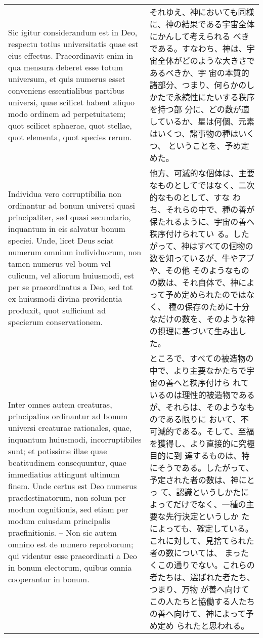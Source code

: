 \documentclass[10pt]{jsarticle} %
\begin{document}
\begin{longtable}{p{21em}p{21em}}
\\


Sic igitur
considerandum est in Deo, respectu totius universitatis quae est eius
effectus. Praeordinavit enim in qua mensura deberet esse totum
universum, et quis numerus esset conveniens essentialibus partibus
universi, quae scilicet habent aliquo modo ordinem ad perpetuitatem;
quot scilicet sphaerae, quot stellae, quot elementa, quot species
rerum. 


&

それゆえ、神においても同様に、神の結果である宇宙全体にかんして考えられる
 べきである。すなわち、神は、宇宙全体がどのような大きさであるべきか、宇
 宙の本質的諸部分、つまり、何らかのしかたで永続性にたいする秩序を持つ部
 分に、どの数が適しているか、星は何個、元素はいくつ、諸事物の種はいくつ、
 ということを、予め定めた。


\\


Individua vero corruptibilia non ordinantur ad bonum universi
quasi principaliter, sed quasi secundario, inquantum in eis salvatur
bonum speciei. Unde, licet Deus sciat numerum omnium individuorum, non
tamen numerus vel boum vel culicum, vel aliorum huiusmodi, est per se
praeordinatus a Deo, sed tot ex huiusmodi divina providentia produxit,
quot sufficiunt ad specierum conservationem. 

&

他方、可滅的な個体は、主要なものとしてではなく、二次的なものとして、すな
 わち、それらの中で、種の善が保たれるように、宇宙の善へ秩序付けられてい
 る。したがって、神はすべての個物の数を知っているが、牛やアブや、その他
 そのようなものの数は、それ自体で、神によって予め定められたのではなく、
 種の保存のために十分なだけの数を、そのような神の摂理に基づいて生み出し
 た。


\\

Inter omnes autem
creaturas, principalius ordinantur ad bonum universi creaturae
rationales, quae, inquantum huiusmodi, incorruptibiles sunt; et
potissime illae quae beatitudinem consequuntur, quae immediatius
attingunt ultimum finem. Unde certus est Deo numerus praedestinatorum,
non solum per modum cognitionis, sed etiam per modum cuiusdam
principalis praefinitionis. -- Non sic autem omnino est de numero
reproborum; qui videntur esse praeordinati a Deo in bonum electorum,
quibus omnia cooperantur in bonum. 



&

ところで、すべての被造物の中で、より主要なかたちで宇宙の善へと秩序付けら
 れているのは理性的被造物であるが、それらは、そのようなものである限りに
 おいて、不可滅的である。そして、至福を獲得し、より直接的に究極目的に到
 達するものは、特にそうである。したがって、予定された者の数は、神にとっ
 て、認識というしかたによってだけでなく、一種の主要な先行決定というしか
 たによっても、確定している。これに対して、見捨てられた者の数については、
 まったくこの通りでない。これらの者たちは、選ばれた者たち、つまり、万物
 が善へ向けてこの人たちと協働する人たちの善へ向けて、神によって予め定め
 られたと思われる。




\end{longtable}
\end{document}
